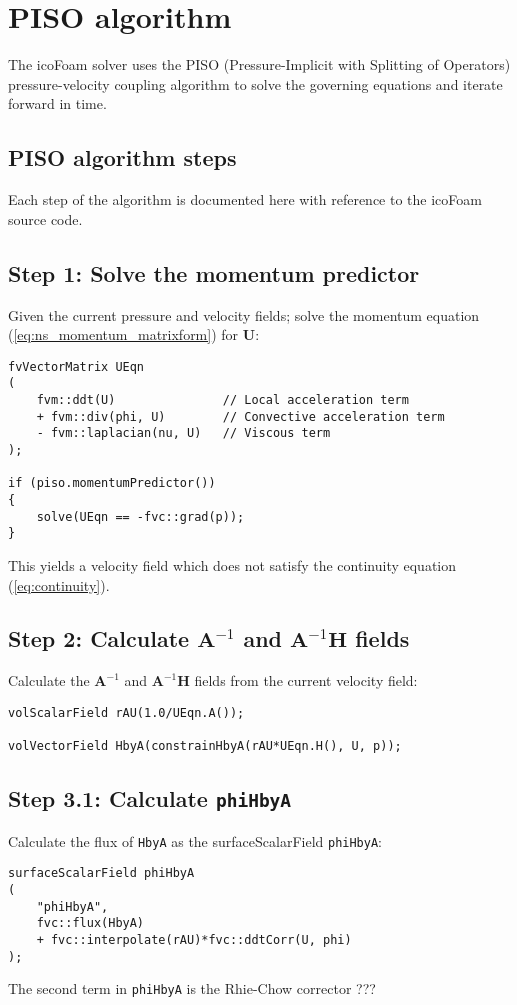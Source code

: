 \documentclass[a4paper,11pt]{report}
\begin{document}
\section{PISO algorithm}
The icoFoam solver uses the PISO (Pressure-Implicit with Splitting of Operators) pressure-velocity coupling algorithm to solve the governing equations and iterate forward in time.
\subsection{PISO algorithm steps}
Each step of the algorithm is documented here with reference to the icoFoam source code.
\subsection*{Step 1: Solve the momentum predictor}
Given the current pressure and velocity fields; solve the momentum equation (\ref{eq:ns_momentum_matrixform}) for $\mathbf{U}$:
\begin{verbatim}
fvVectorMatrix UEqn
(
    fvm::ddt(U)               // Local acceleration term
    + fvm::div(phi, U)        // Convective acceleration term
    - fvm::laplacian(nu, U)   // Viscous term
);

if (piso.momentumPredictor())
{
    solve(UEqn == -fvc::grad(p));
}
\end{verbatim}
This yields a velocity field which does not satisfy the continuity equation (\ref{eq:continuity}).

\subsection*{Step 2: Calculate $\mathbf{A}^{-1}$ and $\mathbf{A}^{-1}\mathbf{H}$ fields}
Calculate the $\mathbf{A}^{-1}$ and $\mathbf{A}^{-1}\mathbf{H}$ fields from the current velocity field:
\begin{verbatim}
volScalarField rAU(1.0/UEqn.A());

volVectorField HbyA(constrainHbyA(rAU*UEqn.H(), U, p));
\end{verbatim}

\subsection*{Step 3.1: Calculate \texttt{phiHbyA}}
Calculate the flux of \texttt{HbyA} as the surfaceScalarField \texttt{phiHbyA}:
\begin{verbatim}
surfaceScalarField phiHbyA
(
    "phiHbyA",
    fvc::flux(HbyA)
    + fvc::interpolate(rAU)*fvc::ddtCorr(U, phi)
);
\end{verbatim}
The second term in \texttt{phiHbyA} is the Rhie-Chow corrector \cite{Rhie1983}???
\end{document}
